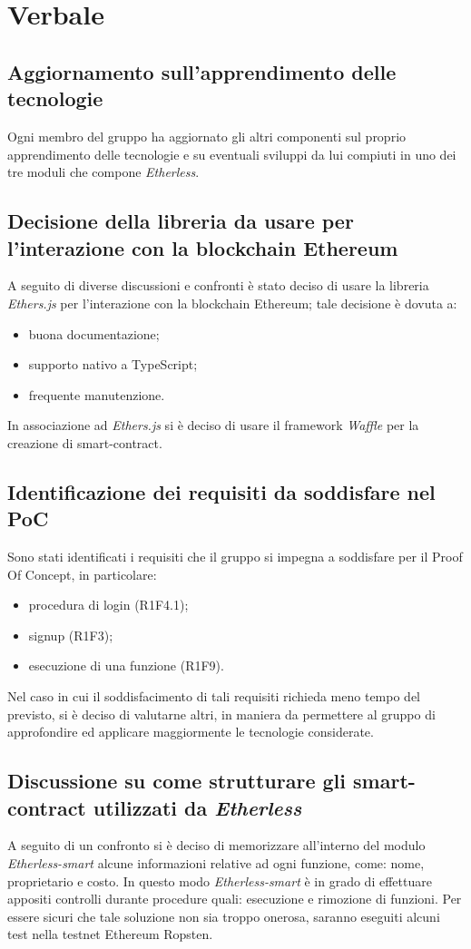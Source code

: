 \section{Verbale}

	\subsection{Aggiornamento sull'apprendimento delle tecnologie}
	Ogni membro del gruppo ha aggiornato gli altri componenti sul proprio apprendimento delle tecnologie e su eventuali sviluppi da lui compiuti in uno dei tre moduli che compone \textit{Etherless}. 
	
	\subsection{Decisione della libreria da usare per l'interazione con la blockchain Ethereum}
	A seguito di diverse discussioni e confronti è stato deciso di usare la libreria \textit{Ethers.js} per l'interazione con la blockchain Ethereum; tale decisione è dovuta a: 
		\begin{itemize}
			\item buona documentazione; 
			\item supporto nativo a TypeScript; 
			\item frequente manutenzione. 
		\end{itemize}
	\noindent In associazione ad \textit{Ethers.js} si è deciso di usare il framework \textit{Waffle} per la creazione di smart-contract.
	
	\subsection{Identificazione dei requisiti da soddisfare nel PoC}
	Sono stati identificati i requisiti che il gruppo si impegna a soddisfare per il Proof Of Concept, 
	in particolare: 
		\begin{itemize}
			\item procedura di login (R1F4.1); 
			\item signup (R1F3); 
			\item esecuzione di una funzione (R1F9). 
		\end{itemize}
	Nel caso in cui il soddisfacimento di tali requisiti richieda meno tempo del previsto, si è deciso di valutarne altri, in maniera da permettere al gruppo di approfondire ed applicare maggiormente le tecnologie considerate. 
	
	\subsection{Discussione su come strutturare gli smart-contract utilizzati da \textit{Etherless}}
	A seguito di un confronto si è deciso di memorizzare all'interno del modulo \textit{Etherless-smart} alcune informazioni relative ad ogni funzione, come: nome, proprietario e costo. In questo modo \textit{Etherless-smart} è in grado di effettuare appositi controlli durante procedure quali: esecuzione e rimozione di funzioni. 
	Per essere sicuri che tale soluzione non sia troppo onerosa, saranno eseguiti alcuni test nella testnet Ethereum Ropsten. 
	
